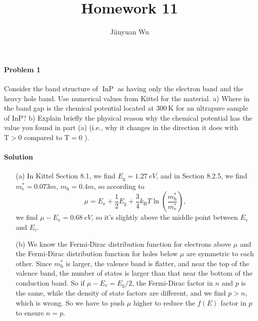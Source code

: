 \documentclass[hyperref, a4paper]{article}
\title{Homework 11}
\author{Jiinyuan Wu}
\begin{document}
    
\maketitle

\paragraph{Problem 1} Consider the band structure of $\operatorname{InP}$ as having only the electron band and the heavy hole band. Use numerical values from Kittel for the material.
a) Where in the band gap is the chemical potential located at $300 \mathrm{~K}$ for an ultrapure sample of InP?
b) Explain briefly the physical reason why the chemical potential has the value you found in part (a) (i.e., why it changes in the direction it does with $\mathrm{T}>0$ compared to $\mathrm{T}=0$ ).

\paragraph{Solution} \begin{itemize}
\item[(a)] In Kittel Section 8.1, we find $E_{\text{g}} = \SI{1.27}{eV}$, 
and in Section 8.2.5, we find $m^*_{\text{e}} = 0.073m$, 
$m_{\text{h}} = 0.4m$, 
so according to 
\begin{equation}
    \mu = E_{\text{v}} + \frac{1}{2} E_{\text{g}} + \frac{3}{4} k_{\text{B}} T \ln(\frac{m_\text{h}^*}{m_{\text{e}}^*}),
\end{equation}
we find $\mu - E_{\text{v}} = \SI{0.68}{eV}$, so it's slightly 
above the middle point between $E_{\text{v}}$ and $E_{\text{c}}$.

\item[(b)] We know the Fermi-Dirac distribution function for electrons above $\mu$
and the Fermi-Dirac distribution function for holes below $\mu$
are symmetric to each other.
Since $m^*_{\text{h}}$ is larger, 
the valence band is flatter,
and near the top of the valence band,
the number of states is larger than that near the bottom of the conduction band.
So if $\mu - E_{\text{v}} = E_{\text{g}} / 2$, 
the Fermi-Dirac factor in $n$ and $p$ is the same,
while the density of state factors are different, 
and we find $p > n$, which is wrong.
So we have to push $\mu$ higher to reduce the $f(E)$ factor in $p$
to ensure $n = p$.

\end{itemize}
\end{document}
